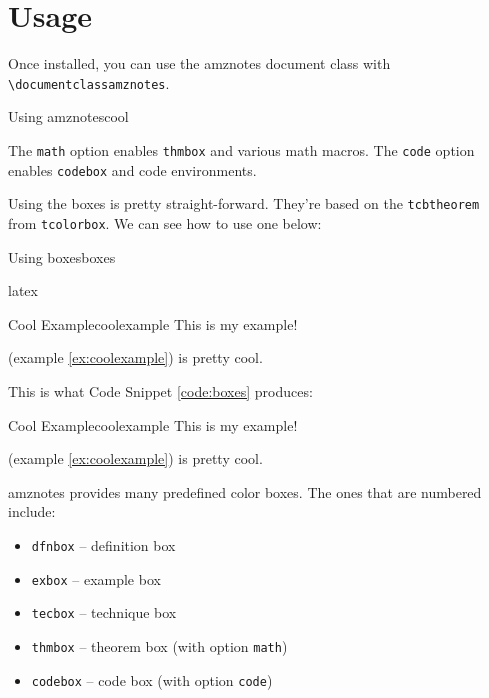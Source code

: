 \documentclass[math,code]{amznotes}
\begin{document}
    \section{Usage}
    Once installed, you can use the amznotes document class with \texttt{\textbackslash documentclass\textbraceleft amznotes\textbraceright}.

    \begin{codebox}{Using amznotes}{cool}
    \end{codebox}

    The \texttt{math} option enables \texttt{thmbox} and various math macros. The \texttt{code} option enables \texttt{codebox} and code environments.

    Using the boxes is pretty straight-forward. They're based on the \texttt{tcbtheorem} from \texttt{tcolorbox}. We can see how to use one below:
    \begin{codebox}{Using boxes}{boxes}
        \begin{amzcode}{latex}
            \begin{exbox}{Cool Example}{coolexample}
                This is my example!
            \end{exbox}
             (example \ref{ex:coolexample}) is pretty cool.
        \end{amzcode}
    \end{codebox}

    This is what Code Snippet \ref{code:boxes} produces:

    \begin{notebox}
        \begin{exbox}{Cool Example}{coolexample}
            This is my example!
        \end{exbox}
         (example \ref{ex:coolexample}) is pretty cool.
    \end{notebox}

    amznotes provides many predefined color boxes. The ones that are numbered include:
    \begin{itemize}[noitemsep]
        \item \texttt{dfnbox} -- definition box
        \item \texttt{exbox} -- example box
        \item \texttt{tecbox} -- technique box
        \item \texttt{thmbox} -- theorem box (with option \texttt{math})
        \item \texttt{codebox} -- code box (with option \texttt{code})
    \end{itemize}
\end{document}
